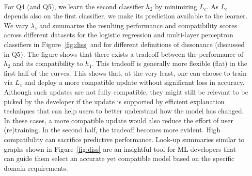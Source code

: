 \documentclass[letterpaper]{article} %
\newcommand{\bug}
    {\mbox{\rule{2mm}{2mm}}}
\newcommand{\Bug}[1]
    {\bug \footnote{BUG: {#1}}}
\newcommand{\?}{\mbox{?}}
\newcommand{\hone}{\mbox{$h_1$}}
\newcommand{\htwo}{\mbox{$h_2$}}
\newcommand{\loss}{L}
\newcommand{\lossbc}{\loss_c}
\newcommand{\lambdabc}{\lambda_c}
\begin{document}
\\
\noindent For Q4 (and Q5), we learn the second classifier $\htwo$ by minimizing $\lossbc$. As $\lossbc$ depends also on the first classifier, we make its prediction available to the learner. We vary $\lambdabc$ and summarize the resulting performance and compatibility scores across different datasets for the logistic regression and multi-layer perceptron classifiers in Figure~\ref{fig:diss} and for different definitions of dissonance (discussed in Q5). 
The figure shows that there exists a tradeoff between the performance of $\htwo$ and its compatibility to $\hone$. This tradeoff is generally more flexible (flat) in the first half of the curves. This shows that, at the very least, one can choose to train via $\lossbc$ and deploy a more compatible update without significant loss in accuracy. Although such updates are not fully compatible, they might still be relevant to be picked by the developer if the update is supported by efficient explanation techniques that can help users to better understand how the model has changed. In these cases, a more compatible update would also reduce the effort of user (re)training. In the second half, the tradeoff becomes more evident. High compatibility can sacrifice predictive performance. Look-up summaries similar to graphs shown in Figure~\ref{fig:diss} are an insightful tool for ML developers that can guide them select an accurate yet compatible model based on the specific domain requirements. \\
\end{document}
